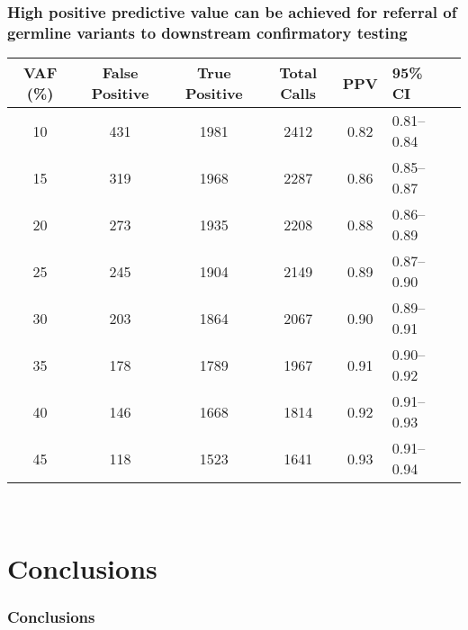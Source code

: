 \documentclass{beamer}
\begin{document}
\begin{frame}
\frametitle{High positive predictive value can be achieved for referral of germline variants to downstream confirmatory testing}
\centering
\scriptsize
\begin{table}[H]
\centering
      \begin{tabular}{cccccll}
        \hline
        VAF (\%) & False Positive & True Positive & Total Calls & PPV & 95\% CI
        \\
        \hline
        10 & 431 & 1981 & 2412 & 0.82 & 0.81--0.84
        \\
        15 & 319 & 1968 & 2287 & 0.86 & 0.85--0.87
        \\
        20 & 273 & 1935 & 2208 & 0.88 & 0.86--0.89
        \\
        25 & 245 & 1904 & 2149 & 0.89 & 0.87--0.90
        \\
        30 & 203 & 1864 & 2067 & 0.90 & 0.89--0.91
        \\
        35 & 178 & 1789 & 1967 & 0.91 & 0.90--0.92
        \\
        40 & 146 & 1668 & 1814 & 0.92 & 0.91--0.93
        \\
        45 & 118 & 1523 & 1641 & 0.93 & 0.91--0.94
        \\
				\hline
      \end{tabular} \\
\end{table}
\end{frame}

\section{Conclusions}
\begin{frame}
\frametitle{Conclusions}
\begin{enumerate}
\end{enumerate}
\end{frame}
\end{document}
